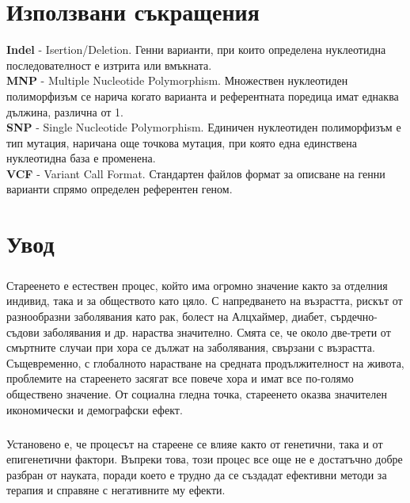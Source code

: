 \documentclass[pdftex,cyrillic,14pt,a4page,twoside]{extreport}
\newcommand\blankpage{%
    \null
    \thispagestyle{empty}%
    \newpage}
\begin{document}
\afterpage{\blankpage}


\tableofcontents
\pagebreak

\setlength\parindent{0pt}

\chapter*{Използвани съкращения}
\textbf{Indel} - Isertion/Deletion. Генни варианти, при които определена нуклеотидна последователност е изтрита или вмъкната.\\
\textbf{MNP} - Multiple Nucleotide Polymorphism. Множествен нуклеотиден полиморфизъм се нарича когато варианта и референтната поредица имат еднаква дължина, различна от 1.\\
\textbf{SNP} - Single Nucleotide Polymorphism. Единичен нуклеотиден полиморфизъм е тип мутация, наричана още точкова мутация, при която една единствена нуклеотидна база е променена.\\
\textbf{VCF} - Variant Call Format. Стандартен файлов формат за описване на генни варианти спрямо определен референтен геном.\\

\chapter{Увод}
\paragraph{}

Стареенето е естествен процес, който има огромно значение както за отделния индивид, така и за обществото като цяло. С напредването на възрастта, рискът от разнообразни заболявания като рак, болест на Алцхаймер, диабет, сърдечно-съдови заболявания и др. нараства значително. Смята се, че около две-трети от смъртните случаи при хора се дължат на заболявания, свързани с възрастта. Същевременно, с глобалното нарастване на средната продължителност на живота, проблемите на стареенето засягат все повече хора и имат все по-голямо обществено значение. От социална гледна точка, стареенето оказва значителен икономически и демографски ефект.

\paragraph{}
Установено е, че процесът на стареене се влияе както от генетични, така и от епигенетични фактори. Въпреки това, този процес все още не е достатъчно добре разбран от науката, поради което е трудно да се създадат ефективни методи за терапия и справяне с негативните му ефекти.
\end{document}
